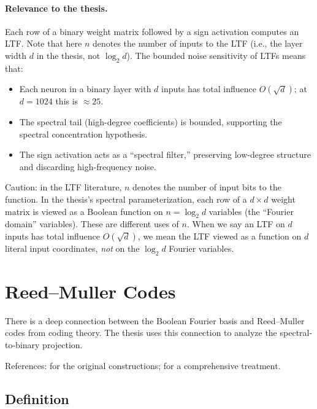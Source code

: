\paragraph{Relevance to the thesis.}
Each row of a binary weight matrix followed by a sign activation computes
an LTF. Note that here $n$ denotes the number of inputs to the LTF
(i.e., the layer width $d$ in the thesis, not $\log_2 d$). The bounded
noise sensitivity of LTFs means that:
\begin{itemize}
  \item Each neuron in a binary layer with $d$ inputs has total influence
    $O(\sqrt{d})$; at $d = 1024$ this is $\approx 25$.
  \item The spectral tail (high-degree coefficients) is bounded, supporting
    the spectral concentration hypothesis.
  \item The sign activation acts as a ``spectral filter,'' preserving
    low-degree structure and discarding high-frequency noise.
\end{itemize}

\begin{remark}\label{rem:ltf-variable-naming}
Caution: in the LTF literature, $n$ denotes the number of input bits to
the function. In the thesis's spectral parameterization, each row of
a $d \times d$ weight matrix is viewed as a Boolean function on
$n = \log_2 d$ variables (the ``Fourier domain'' variables). These are
different uses of $n$. When we say an LTF on $d$ inputs has total
influence $O(\sqrt{d})$, we mean the LTF viewed as a function on $d$
literal input coordinates, \emph{not} on the $\log_2 d$ Fourier variables.
\end{remark}


\section{Reed--Muller Codes}\label{sec:reed-muller}

There is a deep connection between the Boolean Fourier basis and
Reed--Muller codes from coding theory. The thesis uses this connection
to analyze the spectral-to-binary projection.

References: \citet{reed1954class,muller1954application} for the
original constructions; \citet{macwilliams1977theory} for a comprehensive
treatment.

\subsection{Definition}\label{sec:rm-def}

